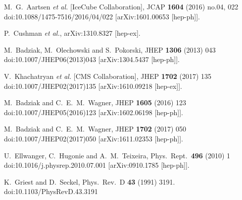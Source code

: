 \documentclass[12pt,twoside]{article}
\begin{document}
\begin{thebibliography}{99}
  M.~G.~Aartsen {\it et al.} [IceCube Collaboration],
  JCAP {\bf 1604} (2016) no.04,  022
  doi:10.1088/1475-7516/2016/04/022
  [arXiv:1601.00653 [hep-ph]].
  

  
  P.~Cushman {\it et al.},
  arXiv:1310.8327 [hep-ex].
 
  
  M.~Badziak, M.~Olechowski and S.~Pokorski,
  JHEP {\bf 1306} (2013) 043
  doi:10.1007/JHEP06(2013)043
  [arXiv:1304.5437 [hep-ph]].
 
  V.~Khachatryan {\it et al.} [CMS Collaboration],
  JHEP {\bf 1702} (2017) 135
  doi:10.1007/JHEP02(2017)135
  [arXiv:1610.09218 [hep-ex]].
 
  M.~Badziak and C.~E.~M.~Wagner,
  JHEP {\bf 1605} (2016) 123
  doi:10.1007/JHEP05(2016)123
  [arXiv:1602.06198 [hep-ph]].
  
  M.~Badziak and C.~E.~M.~Wagner,
  JHEP {\bf 1702} (2017) 050
  doi:10.1007/JHEP02(2017)050
  [arXiv:1611.02353 [hep-ph]].
  

  
  U.~Ellwanger, C.~Hugonie and A.~M.~Teixeira,
  Phys.\ Rept.\  {\bf 496} (2010) 1
  doi:10.1016/j.physrep.2010.07.001
  [arXiv:0910.1785 [hep-ph]].
  
  K.~Griest and D.~Seckel,
  Phys.\ Rev.\ D {\bf 43} (1991) 3191.
  doi:10.1103/PhysRevD.43.3191


\end{thebibliography}
\end{document}
